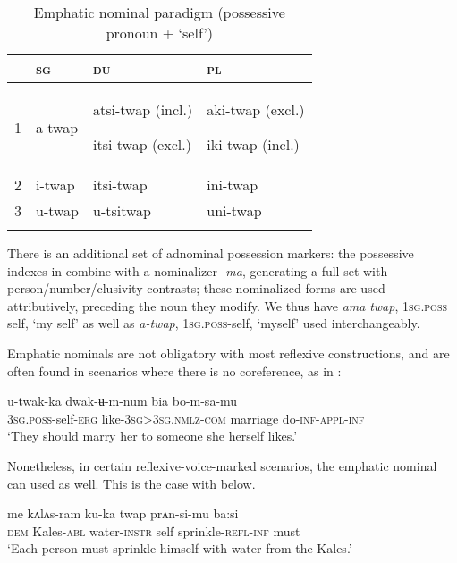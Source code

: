 \documentclass[output=paper]{langscibook}
\begin{document}
\begin{table}
\begin{tabularx}{0.7\textwidth}{lp{1cm}p{1.5cm}p{1.5cm}} 
\lsptoprule
& \textsc{sg} & \textsc{du} & \textsc{pl}\\
\midrule
1 & a-twap & atsi-twap (incl.)

itsi-twap (excl.) & aki-twap (excl.)

iki-twap (incl.)\\
2 & i-twap & itsi-twap & ini-twap\\
3 & u-twap & u-tsitwap & uni-twap\\
\lspbottomrule
\end{tabularx}
\caption{Emphatic nominal paradigm (possessive pronoun + ‘self')}
\label{tab:Lahaussois:4}
\end{table}

There is an additional set of adnominal possession markers: the possessive indexes in  combine with a nominalizer -\textit{ma}, generating a full set with person/number/clusivity contrasts; these nominalized forms are used attributively, preceding the noun they modify.  We thus have \textit{ama} \textit{twap}, 1\textsc{sg}.\textsc{poss} self, ‘my self' as well as \textit{a-twap}, 1\textsc{sg}.\textsc{poss}-self, ‘myself' used interchangeably.

  Emphatic nominals are not obligatory with most reflexive constructions, and are often found in scenarios where there is no coreference, as in :

\ea%
    \label{ex:Lahaussois:21}
    \gll u-twak-ka dwak-ʉ{}-m-num bia bo-m-sa-mu\\
        \textsc{3sg.poss}{}-self-\textsc{erg} like-\textsc{3sg>3sg.nmlz-com} marriage do-\textsc{inf-appl-inf}\\
    \glt ‘They should marry her to someone she herself likes.'
    \z

Nonetheless, in certain reflexive-voice-marked scenarios, the emphatic nominal can used as well. This is the case with  below.  

\ea%
    \label{ex:Lahaussois:22}
    \gll me kʌlʌs-ram ku-ka twap prʌn-si-mu ba:si\\
       \textsc{dem} Kales-\textsc{abl} water-\textsc{instr} self sprinkle-\textsc{refl-inf} must \\
    \glt ‘Each person must sprinkle himself with water from the Kales.'
    \z
\end{document}

